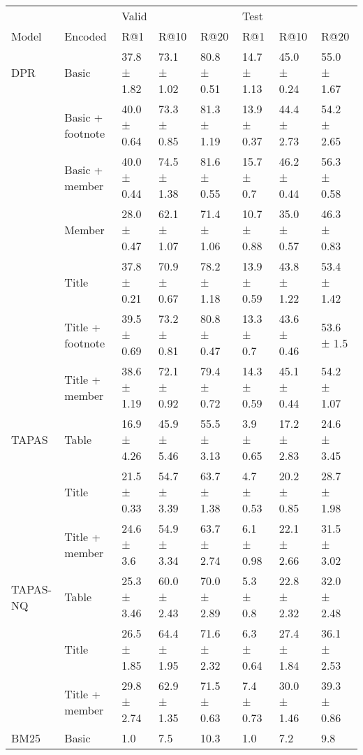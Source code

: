 \documentclass[11pt]{article}
\begin{document}
\begin{table*}[h]
    \small
    \centering
\begin{tabular}{llllllll}
\toprule
     &                & \multicolumn{3}{l}{Valid} & \multicolumn{3}{l}{Test} \\
Model & Encoded &          R@1 &         R@10 &         R@20 &          R@1 &         R@10 &         R@20 \\
\midrule
DPR & Basic &  37.8 ± 1.82 &  73.1 ± 1.02 &  80.8 ± 0.51 &  14.7 ± 1.13 &  45.0 ± 0.24 &  55.0 ± 1.67 \\
     & Basic + footnote &  40.0 ± 0.64 &  73.3 ± 0.85 &  81.3 ± 1.19 &  13.9 ± 0.37 &  44.4 ± 2.73 &  54.2 ± 2.65 \\
     & Basic + member &  40.0 ± 0.44 &  74.5 ± 1.38 &  81.6 ± 0.55 &   15.7 ± 0.7 &  46.2 ± 0.44 &  56.3 ± 0.58 \\
     & Member &  28.0 ± 0.47 &  62.1 ± 1.07 &  71.4 ± 1.06 &  10.7 ± 0.88 &  35.0 ± 0.57 &  46.3 ± 0.83 \\
     & Title &  37.8 ± 0.21 &  70.9 ± 0.67 &  78.2 ± 1.18 &  13.9 ± 0.59 &  43.8 ± 1.22 &  53.4 ± 1.42 \\
     & Title + footnote &  39.5 ± 0.69 &  73.2 ± 0.81 &  80.8 ± 0.47 &   13.3 ± 0.7 &  43.6 ± 0.46 &   53.6 ± 1.5 \\
     & Title + member &  38.6 ± 1.19 &  72.1 ± 0.92 &  79.4 ± 0.72 &  14.3 ± 0.59 &  45.1 ± 0.44 &  54.2 ± 1.07 \\
\midrule
TAPAS & Table &  16.9 ± 4.26 &  45.9 ± 5.46 &  55.5 ± 3.13 &   3.9 ± 0.65 &  17.2 ± 2.83 &  24.6 ± 3.45 \\
     & Title &  21.5 ± 0.33 &  54.7 ± 3.39 &  63.7 ± 1.38 &   4.7 ± 0.53 &  20.2 ± 0.85 &  28.7 ± 1.98 \\
     & Title + member &   24.6 ± 3.6 &  54.9 ± 3.34 &  63.7 ± 2.74 &   6.1 ± 0.98 &  22.1 ± 2.66 &  31.5 ± 3.02 \\
TAPAS-NQ & Table &  25.3 ± 3.46 &  60.0 ± 2.43 &  70.0 ± 2.89 &    5.3 ± 0.8 &  22.8 ± 2.32 &  32.0 ± 2.48 \\
     & Title &  26.5 ± 1.85 &  64.4 ± 1.95 &  71.6 ± 2.32 &   6.3 ± 0.64 &  27.4 ± 1.84 &  36.1 ± 2.53 \\
     & Title + member &  29.8 ± 2.74 &  62.9 ± 1.35 &  71.5 ± 0.63 &   7.4 ± 0.73 &  30.0 ± 1.46 &  39.3 ± 0.86 \\
\midrule
BM25 & Basic &          1.0 &          7.5 &         10.3 &          1.0 &          7.2 &          9.8 \\

\end{tabular}
\end{table*}
\end{document}
